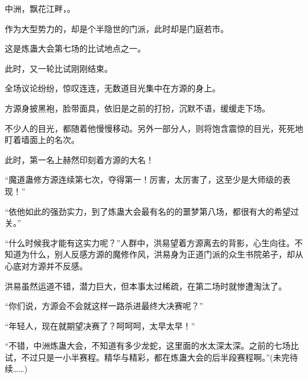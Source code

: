 \begin{this_body}
中洲，飘花江畔，。

作为大型势力的，却是个半隐世的门派，此时却是门庭若市。

这是炼蛊大会第七场的比试地点之一。

此时，又一轮比试刚刚结束。

全场议论纷纷，惊叹连连，无数道目光集中在方源的身上。

方源身披黑袍，脸带面具，依旧是之前的打扮，沉默不语，缓缓走下场。

不少人的目光，都随着他慢慢移动。另外一部分人，则将饱含震惊的目光，死死地盯着墙面上的名次。

此时，第一名上赫然印刻着方源的大名！

“魔道蛊修方源连续第七次，夺得第一！厉害，太厉害了，这至少是大师级的表现！”

“依他如此的强劲实力，到了炼蛊大会最有名的的噩梦第八场，都很有大的希望过关。”

“什么时候我才能有这实力呢？”人群中，洪易望着方源离去的背影，心生向往。不知道为什么，别人反感方源的魔修作风，洪易身为正道门派的众生书院弟子，却从心底对方源并不反感。

洪易虽然运道不错，潜力巨大，但本事太过稀疏，在第二场时就惨遭淘汰了。

“你们说，方源会不会就这样一路杀进最终大决赛呢？”

“年轻人，现在就期望决赛了？呵呵呵，太早太早！”

“不错，中洲炼蛊大会，不知道有多少龙蛇，这里面的水太深太深。之前的七场比试，不过只是一小半赛程。精华与精彩，都在炼蛊大会的后半段赛程啊。”(未完待续……)

\end{this_body}

